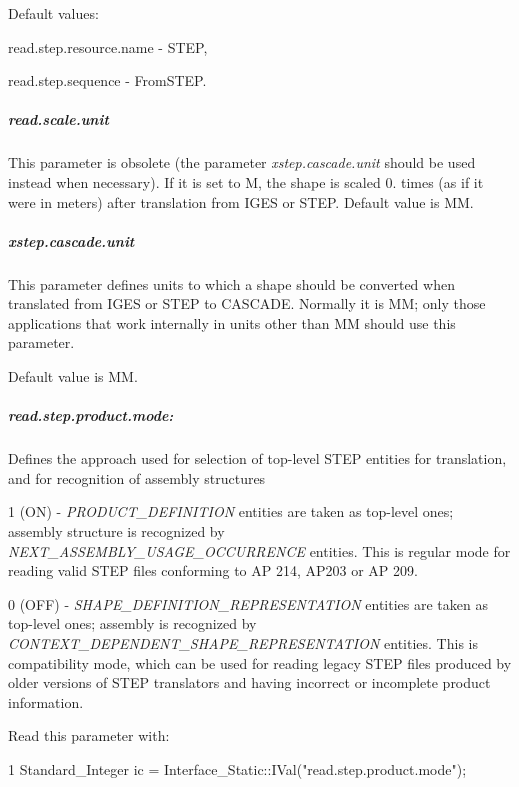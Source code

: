 Default values\+:
\begin{DoxyItemize}
\item read.\+step.\+resource.\+name -\/ S\+T\+EP,
\item read.\+step.\+sequence -\/ From\+S\+T\+EP.
\end{DoxyItemize}

\subparagraph*{read.\+scale.\+unit}

This parameter is obsolete (the parameter {\itshape xstep.\+cascade.\+unit} should be used instead when necessary). If it is set to \textquotesingle{}M\textquotesingle{}, the shape is scaled 0. times (as if it were in meters) after translation from I\+G\+ES or S\+T\+EP. Default value is MM.

\subparagraph*{xstep.\+cascade.\+unit}

This parameter defines units to which a shape should be converted when translated from I\+G\+ES or S\+T\+EP to C\+A\+S\+C\+A\+DE. Normally it is MM; only those applications that work internally in units other than MM should use this parameter.

Default value is MM.

\subparagraph*{read.\+step.\+product.\+mode\+:}

Defines the approach used for selection of top-\/level S\+T\+EP entities for translation, and for recognition of assembly structures
\begin{DoxyItemize}
\item 1 (ON) -\/ {\itshape P\+R\+O\+D\+U\+C\+T\+\_\+\+D\+E\+F\+I\+N\+I\+T\+I\+ON} entities are taken as top-\/level ones; assembly structure is recognized by {\itshape N\+E\+X\+T\+\_\+\+A\+S\+S\+E\+M\+B\+L\+Y\+\_\+\+U\+S\+A\+G\+E\+\_\+\+O\+C\+C\+U\+R\+R\+E\+N\+CE} entities. This is regular mode for reading valid S\+T\+EP files conforming to AP 214, A\+P203 or AP 209.
\item 0 (O\+FF) -\/ {\itshape S\+H\+A\+P\+E\+\_\+\+D\+E\+F\+I\+N\+I\+T\+I\+O\+N\+\_\+\+R\+E\+P\+R\+E\+S\+E\+N\+T\+A\+T\+I\+ON} entities are taken as top-\/level ones; assembly is recognized by {\itshape C\+O\+N\+T\+E\+X\+T\+\_\+\+D\+E\+P\+E\+N\+D\+E\+N\+T\+\_\+\+S\+H\+A\+P\+E\+\_\+\+R\+E\+P\+R\+E\+S\+E\+N\+T\+A\+T\+I\+ON} entities. This is compatibility mode, which can be used for reading legacy S\+T\+EP files produced by older versions of S\+T\+EP translators and having incorrect or incomplete product information.
\end{DoxyItemize}

Read this parameter with\+: 
\begin{DoxyCode}
1 Standard\_Integer ic = Interface\_Static::IVal("read.step.product.mode");  
\end{DoxyCode}


